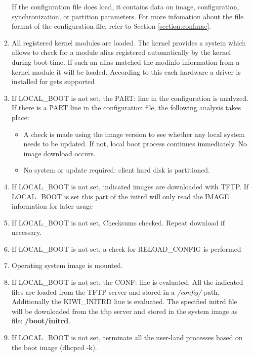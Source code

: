 \begin{enumerate}
          If the configuration file does load, it contains data on
          image, configuration, synchronization, or partition parameters.
          For more infomation about the file format of the configuration file,
          refer to Section \ref{section:confmac}.
	\item All registered kernel modules are loaded. The kernel provides
          a system which allows to check for a module alias registered
          automatically by the kernel during boot time. If such an alias
          matched the modinfo information from a kernel module it will
          be loaded. According to this each hardware a driver is installed
          for gets supported
	\item If LOCAL\_BOOT is not set, the PART: line in the configuration
          is analyzed. If there is a
          PART line in the configuration file, the following analysis
          takes place:
          \begin{itemize}
          \item A check is made using the image version to see whether any
                local system needs to be updated. If not, local boot process
                continues immediately. No image download occurs.
          \item No system or update required: client hard disk is
                partitioned.
          \end{itemize}
	\item If LOCAL\_BOOT is not set, indicated images are downloaded
          with TFTP. If LOCAL\_BOOT is set this part of the initrd will
          only read the IMAGE information for later usage
	\item If LOCAL\_BOOT is not set, Checksums checked. Repeat download
          if necessary.
	\item If LOCAL\_BOOT is not set, a check for RELOAD\_CONFIG is performed
	\item Operating system image is mounted.
	\item If LOCAL\_BOOT is not set, the CONF: line is evaluated. All the
          indicated files are loaded
          from the TFTP server and stored in a \textit{/config/} path.
          Additionally the KIWI\_INITRD line is evaluated. The specified
          initrd file will be downloaded from the tftp server and stored
          in the system image as file: \textbf{/boot/initrd}.
	\item If LOCAL\_BOOT is not set, terminate all the user-land processes
          based on the boot image (dhcpcd -k).

\end{enumerate}
